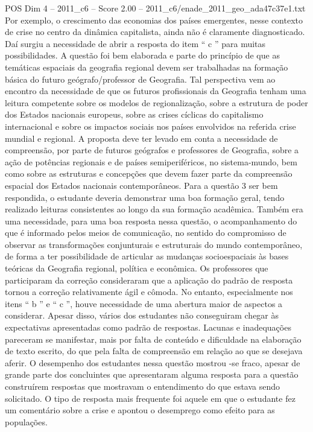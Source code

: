 \begin{textsample}{POS Dim 4 – 2011\_c6 – Score 2.00 – 2011\_c6/enade\_2011\_geo\_ada47c37e1.txt}
Por exemplo, o crescimento das economias dos países emergentes, nesse contexto de crise no centro da dinâmica capitalista, ainda não é claramente diagnosticado.
Daí surgiu a necessidade de abrir a resposta do item “ c ” para muitas possibilidades.
A questão foi bem elaborada e parte do princípio de que as temáticas espaciais da geografia regional devem ser trabalhadas na formação básica do futuro geógrafo/professor de Geografia.
Tal perspectiva vem ao encontro da necessidade de que os futuros profissionais da Geografia tenham uma leitura competente sobre os modelos de regionalização, sobre a estrutura de poder dos Estados nacionais europeus, sobre as crises cíclicas do capitalismo internacional e sobre os impactos sociais nos países envolvidos na referida crise mundial e regional.
A proposta deve ter levado em conta a necessidade de compreensão, por parte de futuros geógrafos e professores de Geografia, sobre a ação de potências regionais e de países semiperiféricos, no sistema-mundo, bem como sobre as estruturas e concepções que devem fazer parte da compreensão espacial dos Estados nacionais contemporâneos.
Para a questão 3 ser bem respondida, o estudante deveria demonstrar uma boa formação geral, tendo realizado leituras consistentes ao longo da sua formação acadêmica.
Também era uma necessidade, para uma boa resposta nessa questão, o acompanhamento do que é informado pelos meios de comunicação, no sentido do compromisso de observar as transformações conjunturais e estruturais do mundo contemporâneo, de forma a ter possibilidade de articular as mudanças socioespaciais às bases teóricas da Geografia regional, política e econômica.
Os professores que participaram da correção consideraram que a aplicação do padrão de resposta tornou a correção relativamente ágil e cômoda.
No entanto, especialmente nos itens “ b ” e “ c ”, houve necessidade de uma abertura maior de aspectos a considerar.
Apesar disso, vários dos estudantes não conseguiram chegar às expectativas apresentadas como padrão de respostas.
Lacunas e inadequações pareceram se manifestar, mais por falta de conteúdo e dificuldade na elaboração de texto escrito, do que pela falta de compreensão em relação ao que se desejava aferir.
O desempenho dos estudantes nessa questão mostrou -se fraco, apesar de grande parte dos concluintes que apresentaram alguma resposta para a questão construírem respostas que mostravam o entendimento do que estava sendo solicitado.
O tipo de resposta mais frequente foi aquele em que o estudante fez um comentário sobre a crise e apontou o desemprego como efeito para as populações.

\end{textsample}

